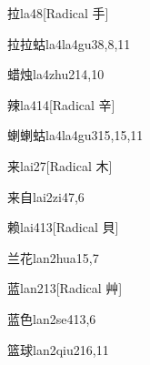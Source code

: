\begin{verbete}{拉}{la4}{8}[Radical 手]
\end{verbete}

\begin{verbete}{拉拉蛄}{la4la4gu3}{8,8,11}
\end{verbete}

\begin{verbete}{蜡烛}{la4zhu2}{14,10}
\end{verbete}

\begin{verbete}{辣}{la4}{14}[Radical 辛]
\end{verbete}

\begin{verbete}{蝲蝲蛄}{la4la4gu3}{15,15,11}
\end{verbete}

\begin{verbete}{来}{lai2}{7}[Radical 木]
\end{verbete}

\begin{verbete}{来自}{lai2zi4}{7,6}
\end{verbete}

\begin{verbete}{赖}{lai4}{13}[Radical 貝]
\end{verbete}

\begin{verbete}{兰花}{lan2hua1}{5,7}
\end{verbete}

\begin{verbete}{蓝}{lan2}{13}[Radical 艸]
\end{verbete}

\begin{verbete}{蓝色}{lan2se4}{13,6}
\end{verbete}

\begin{verbete}{篮球}{lan2qiu2}{16,11}
\end{verbete}

